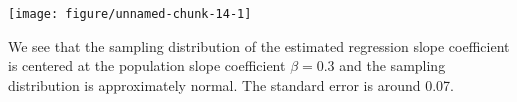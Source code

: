 \documentclass[addpoints,12pt]{exam}\usepackage[]{graphicx}\usepackage[]{color}
\makeatletter
\def\maxwidth{ %
  \ifdim\Gin@nat@width>\linewidth
    \linewidth
  \else
    \Gin@nat@width
  \fi
}
\newenvironment{knitrout}{}{} %
\makeatother
\begin{document}
\begin{questions}
\begin{parts}
\begin{solution}
\begin{knitrout}
{\centering \texttt{[image: figure/unnamed-chunk-14-1]} 

}



\end{knitrout}
  We see that the sampling distribution of the estimated regression slope coefficient is centered at the population slope coefficient $\beta = 0.3$ and the sampling distribution is approximately normal. The standard error is around 0.07.
  \end{solution}
  \end{parts}	
  
  \end{questions}
  
  
\end{document}
